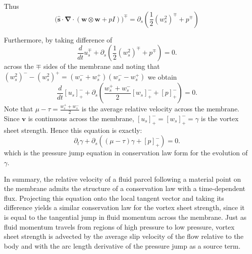 \documentclass{article}[12pt]
\theoremstyle{Theorem}
\begin{document}
Thus 
\begin{equation}
\bigg(\hat{\boldsymbol{s}}\cdot\boldsymbol{\nabla}\cdot(\boldsymbol{w}\otimes\boldsymbol{w} + pI)\bigg)^\mp = \partial_s(\frac{1}{2}(w_s^2)^\mp +p^\mp)
\end{equation}

Furthermore, by taking difference of
\begin{equation}
    \frac{d}{dt}u_s^\mp  + \partial_s(\frac{1}{2}(w_s^2)^\mp +p^\mp) = 0.
\end{equation}
across the $\mp$ sides of the membrane and noting that $(w_s^2)^- - (w_s^2)^+ = (w_s^- + w_s^+ )(w_s^- - w_s^+)$ we obtain
\begin{equation}
    \frac{d}{dt}[u_s]^-_+  + \partial_s(\frac{w_s^+ +w_s^-}{2}[w_s]^-_+ +[p]^-_+) = 0.
\end{equation}
Note that $\mu -\tau = \frac{w_s^+ +w_s^-}{2}$ is the average relative velocity across the membrane. Since $\boldsymbol{v}$ is continuous across the membrane, $[u_s]^-_+ =[w_s]^-_+ = \gamma$ is the vortex sheet strength. Hence this equation is exactly:
\begin{equation}
    \partial_t\gamma  + \partial_s((\mu -\tau)\gamma+[p]^-_+) = 0.
\end{equation}
which is the pressure jump equation in conservation law form for the evolution of $\gamma$.
\newline

In summary, the relative velocity of a fluid parcel following a material point on the membrane admits the structure of a conservation law with a time-dependent flux. Projecting this equation onto the local tangent vector and taking its difference yields a similar conservation law for the vortex sheet strength, since it is equal to the tangential jump in fluid momentum across the membrane. Just as fluid momentum travels from regions of high pressure to low pressure, vortex sheet strength is advected by the average slip velocity of the flow relative to the body and with the arc length derivative of the pressure jump as a source term.

\printbibliography[
heading=bibintoc,
title={References}
]
\end{document}
